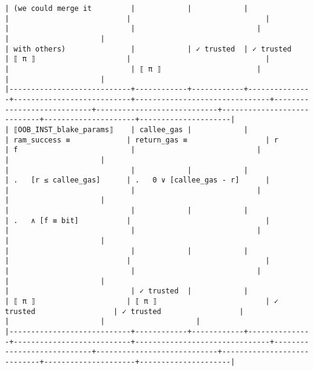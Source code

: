 \documentclass[varwidth=\maxdimen,margin=0.5cm,multi={verbatim}]{standalone}
\begin{document}
\begin{verbatim}
| (we could merge it         |            |            |               |                           |                               |                            |                            |                            |                     |                     |
| with others)               |            | ✓ trusted  | ✓ trusted     | ⟦ π ⟧                     |                               |                            |                            | ⟦ π ⟧                      |                     |                     |
|----------------------------+------------+------------+---------------+---------------------------+-------------------------------+----------------------------+----------------------------+----------------------------+---------------------+---------------------|
| ⟦OOB_INST_blake_params⟧    | callee_gas |            |               | ram_success ≡             | return_gas ≡                  | r                          | f                          |                            |                     |                     |
|                            |            |            |               | .   [r ≤ callee_gas]      | .   0 ∨ [callee_gas - r]      |                            |                            |                            |                     |                     |
|                            |            |            |               | .   ∧ [f ≡ bit]           |                               |                            |                            |                            |                     |                     |
|                            |            |            |               |                           |                               |                            |                            |                            |                     |                     |
|                            | ✓ trusted  |            |               | ⟦ π ⟧                     | ⟦ π ⟧                         | ✓ trusted                  | ✓ trusted                  |                            |                     |                     |
|----------------------------+------------+------------+---------------+---------------------------+-------------------------------+----------------------------+----------------------------+----------------------------+---------------------+---------------------|



\end{verbatim}
\end{document}
